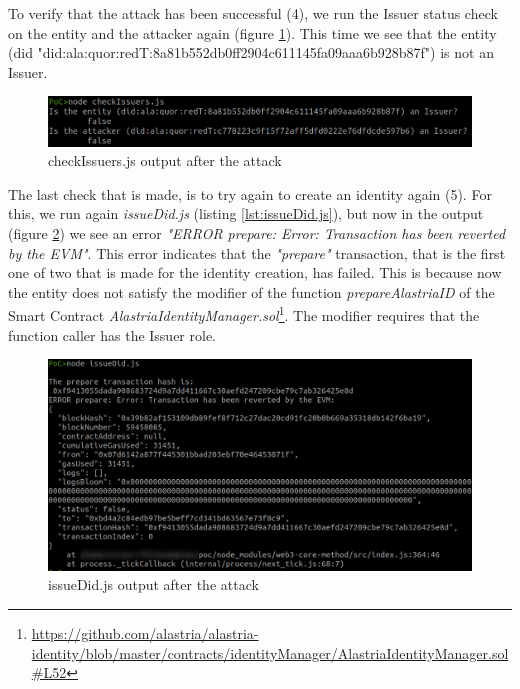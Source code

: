 \documentclass[a4paper, 12pt]{article} %
\begin{document}
        To verify that the attack has been successful (4), we run the Issuer status check on the entity and the attacker again (figure \ref{fig:poc-4}). This time we see that the entity (\acrshort{did} "did:ala:quor:redT:8a81b552db0ff2904c611145fa09aaa6b928b87f") is not an Issuer.\\
        \begin{figure}[h]
            \centering
            \includegraphics[width=1.0\textwidth]{poc/4.png}
            \caption{checkIssuers.js output after the attack}
            \label{fig:poc-4}
        \end{figure}
        
        The last check that is made, is to try again to create an identity again (5). For this, we run again \textit{issueDid.js} (listing \ref{lst:issueDid.js}), but now in the output (figure \ref{fig:poc-5}) we see an error \textit{"ERROR prepare: Error: Transaction has been reverted by the EVM"}. This error indicates that the \textit{"prepare"} transaction, that is the first one of two that is made for the identity creation, has failed. This is because now the entity does not satisfy the modifier of the function \textit{prepareAlastriaID} of the Smart Contract \textit{AlastriaIdentityManager.sol}\footnote{\url{https://github.com/alastria/alastria-identity/blob/master/contracts/identityManager/AlastriaIdentityManager.sol\#L52}}. The modifier requires that the function caller has the Issuer role.
        \begin{figure}[h]
            \centering
            \includegraphics[width=1.0\textwidth]{poc/5.png}
            \caption{issueDid.js output after the attack}
            \label{fig:poc-5}
        \end{figure}
        
\end{document}
